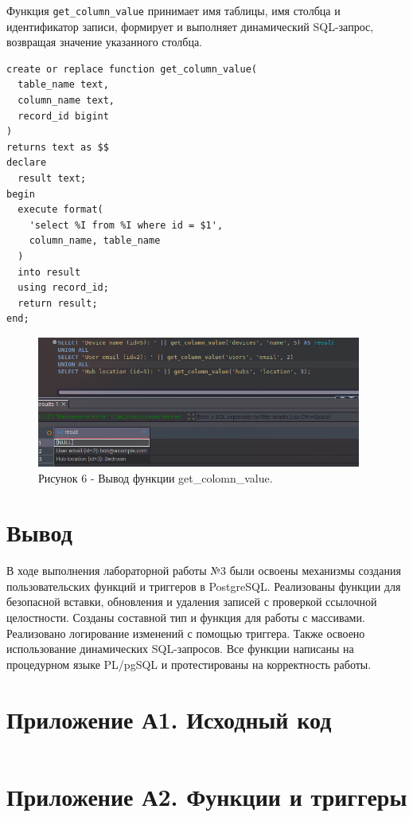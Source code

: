 \documentclass[oneside,a4paper,14pt]{extarticle}
\begin{document}
Функция \texttt{get\_column\_value} принимает имя таблицы, имя столбца и идентификатор записи, формирует и выполняет динамический SQL-запрос, возвращая значение указанного столбца.

\begin{verbatim}
create or replace function get_column_value(
  table_name text,
  column_name text,
  record_id bigint
)
returns text as $$
declare
  result text;
begin
  execute format(
    'select %I from %I where id = $1',
    column_name, table_name
  )
  into result
  using record_id;
  return result;
end;
\end{verbatim}

\begin{figure}[H]
  \centering
  \includegraphics[width=0.95\textwidth]{pics/get_colomn_value.png}
  \caption*{Рисунок 6 - Вывод функции get\_colomn\_value.}
\end{figure}

\section*{Вывод}

В ходе выполнения лабораторной работы №3 были освоены механизмы создания пользовательских функций и триггеров в PostgreSQL. Реализованы функции для безопасной вставки, обновления и удаления записей с проверкой ссылочной целостности. Созданы составной тип и функция для работы с массивами. Реализовано логирование изменений с помощью триггера. Также освоено использование динамических SQL-запросов. Все функции написаны на процедурном языке PL/pgSQL и протестированы на корректность работы.

\newpage

\section*{Приложение А1. Исходный код}
\inputminted{Dockerfile}{../Containerfile}

\section*{Приложение А2. Функции и триггеры}
\inputminted{sql}{code/functions_triggers.sql}
\end{document}

